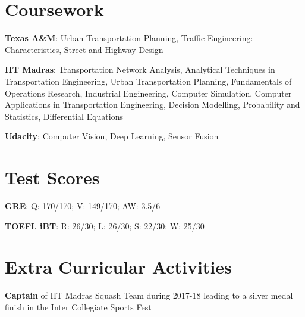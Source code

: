 \documentclass[letterpaper,11pt]{article}
\newcommand{\resumeItem}[2]{
  \item\small{
    \textbf{#1}{: #2 \vspace{-2pt}}
  }
}
\newcommand{\ritem}[1]{
  \item\small{
    {#1 \vspace{-2pt}}
  }
}
\newcommand{\resumeSubItem}[2]{\resumeItem{#1}{#2}\vspace{-4pt}}
\newcommand{\resumeSubHeadingListStart}{\begin{description}[leftmargin=*]}
\newcommand{\resumeSubHeadingListEnd}{\end{description}\vspace{-6pt}}
\begin{document}
\section{Coursework}
  \resumeSubHeadingListStart
    \justifying\resumeSubItem{Texas A\&M}
    {Urban Transportation Planning, Traffic Engineering: Characteristics, Street and Highway Design}
    \justifying\resumeSubItem
      {IIT Madras}{Transportation Network Analysis, Analytical Techniques in Transportation Engineering, Urban Transportation Planning, Fundamentals of Operations Research, Industrial Engineering, Computer Simulation, Computer Applications in Transportation Engineering, Decision Modelling, Probability and Statistics, Differential Equations}
    \justifying\resumeSubItem
      {Udacity}{Computer Vision, Deep Learning, Sensor Fusion}
  \resumeSubHeadingListEnd

\section{Test Scores}
  \resumeSubHeadingListStart
    \resumeSubItem{GRE}
      {Q: 170/170; V: 149/170; AW: 3.5/6}
    \resumeSubItem{TOEFL iBT}
      {R: 26/30; L: 26/30; S: 22/30; W: 25/30}
  \resumeSubHeadingListEnd

\section{Extra Curricular Activities}
  \resumeSubHeadingListStart
    \ritem{\textbf{Captain} of IIT Madras Squash Team during 2017-18 leading to a silver medal finish in the Inter Collegiate Sports Fest}
  \resumeSubHeadingListEnd

\end{document}
